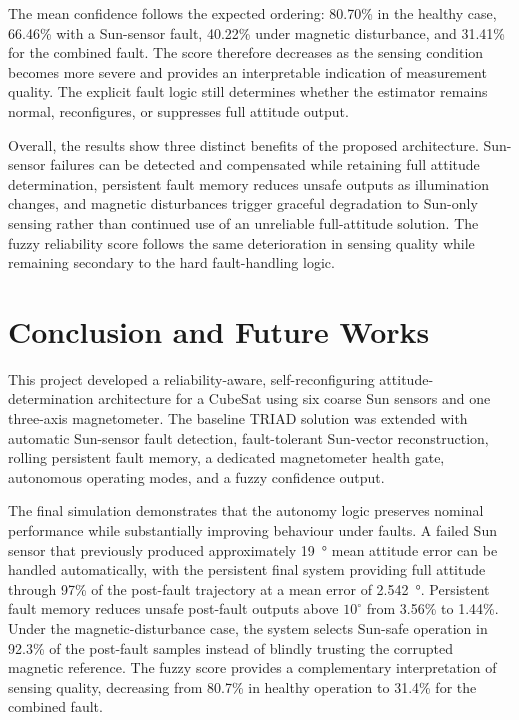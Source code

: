 \documentclass[11pt,a4paper]{article}
\begin{document}
The mean confidence follows the expected ordering: 80.70\% in the healthy case, 66.46\% with a Sun-sensor fault, 40.22\% under magnetic disturbance, and 31.41\% for the combined fault. The score therefore decreases as the sensing condition becomes more severe and provides an interpretable indication of measurement quality. The explicit fault logic still determines whether the estimator remains normal, reconfigures, or suppresses full attitude output.

Overall, the results show three distinct benefits of the proposed architecture. Sun-sensor failures can be detected and compensated while retaining full attitude determination, persistent fault memory reduces unsafe outputs as illumination changes, and magnetic disturbances trigger graceful degradation to Sun-only sensing rather than continued use of an unreliable full-attitude solution. The fuzzy reliability score follows the same deterioration in sensing quality while remaining secondary to the hard fault-handling logic.

\clearpage

\section{Conclusion and Future Works}

This project developed a reliability-aware, self-reconfiguring attitude-determination architecture for a CubeSat using six coarse Sun sensors and one three-axis magnetometer. The baseline TRIAD solution was extended with automatic Sun-sensor fault detection, fault-tolerant Sun-vector reconstruction, rolling persistent fault memory, a dedicated magnetometer health gate, autonomous operating modes, and a fuzzy confidence output.

The final simulation demonstrates that the autonomy logic preserves nominal performance while substantially improving behaviour under faults. A failed Sun sensor that previously produced approximately \SI{19}{\degree} mean attitude error can be handled automatically, with the persistent final system providing full attitude through 97\% of the post-fault trajectory at a mean error of \SI{2.542}{\degree}. Persistent fault memory reduces unsafe post-fault outputs above $10^\circ$ from 3.56\% to 1.44\%. Under the magnetic-disturbance case, the system selects Sun-safe operation in 92.3\% of the post-fault samples instead of blindly trusting the corrupted magnetic reference. The fuzzy score provides a complementary interpretation of sensing quality, decreasing from 80.7\% in healthy operation to 31.4\% for the combined fault.
\end{document}
